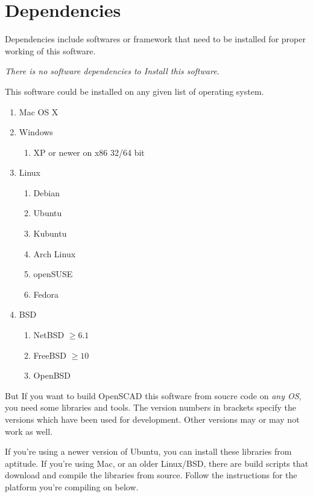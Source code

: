 \section{Dependencies}
Dependencies include softwares or framework that need to be installed for proper working of this software.

\emph{{\large There is no software dependencies to Install this software.}}

This software could be installed on any given list of operating system.

\begin{enumerate}
	\item Mac OS X
	\item Windows
	 \begin{enumerate} 
	 	\item XP or newer on x86 32/64 bit
	 \end{enumerate}
	\item Linux
	\begin{enumerate} 
		\item Debian 
		\item Ubuntu 
		\item Kubuntu
		\item Arch Linux
		\item openSUSE
		\item Fedora
	 \end{enumerate}
	\item BSD
	\begin{enumerate}
		\item NetBSD  $\geq 6.1$
		\item FreeBSD $\geq 10 $
		\item OpenBSD
	\end{enumerate}
\end{enumerate}	 
 

But If you want to build OpenSCAD this software from soucre code on \emph{any OS}, you need some libraries and tools. The version
numbers in brackets specify the versions which have been used for
development. Other versions may or may not work as well.

If you're using a newer version of Ubuntu, you can install these 
libraries from aptitude. If you're using Mac, or an older Linux/BSD, there 
are build scripts that download and compile the libraries from source. 
Follow the instructions for the platform you're compiling on below.

